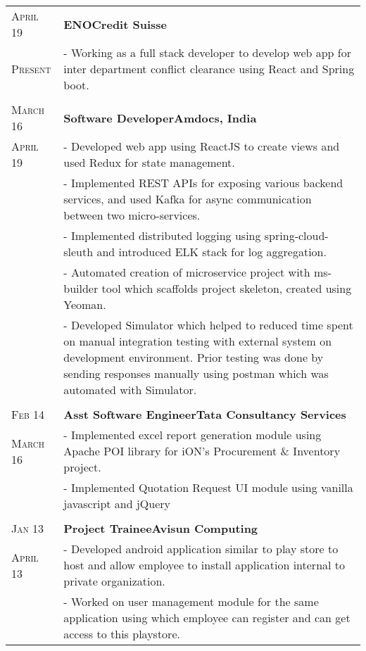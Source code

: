 \documentclass[a4paper,10pt]{extarticle} %
\begin{document}
\begin{tabularx}{\linewidth}{ l | X }

\textsc{April 19} & \textbf{ENO}\hfill\textbf{Credit Suisse}\\
\textsc{Present}& {- Working as a full stack developer to develop web app for inter department conflict clearance using React and Spring boot.}\\

\multicolumn{2}{c}{} \\

\textsc{March 16} & \textbf{Software Developer}\hfill\textbf{Amdocs, India}\\
\textsc{April 19}& {- Developed web app using ReactJS to create views and used Redux for state management.}\\
& {- Implemented REST APIs for exposing various backend services, and used Kafka for async communication between two micro-services.}\\
& {- Implemented distributed logging using spring-cloud-sleuth and introduced ELK stack for log aggregation.}\\
& {- Automated creation of microservice project with ms-builder tool which scaffolds project skeleton, created using Yeoman.}\\
& {- Developed Simulator which helped to reduced time spent on manual integration testing with external system on development environment. Prior testing was done by sending responses manually using postman which was automated with Simulator.}\\

\multicolumn{2}{c}{} \\

\textsc{Feb 14} & \textbf{Asst Software Engineer}\hfill\textbf{Tata Consultancy Services}\\
\textsc{March 16}& {- Implemented excel report generation module using Apache POI library for iON's Procurement \& Inventory project.}\\
& {- Implemented Quotation Request UI module using vanilla javascript and jQuery}\\
\multicolumn{2}{c}{} \\

\textsc{Jan 13} & \textbf{Project Trainee}\hfill\textbf{Avisun Computing}\\
\textsc{April 13} & {- Developed android application similar to play store to host and allow employee to install application internal to private organization.}\\
& {- Worked on user management module for the same application using which employee can register and can get access to this playstore.}

\end{tabularx}
\end{document}
